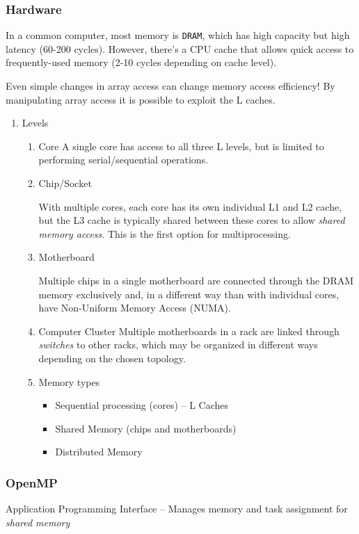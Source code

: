 \documentclass[11pt]{article}
\begin{document}
\subsubsection{Hardware}
\label{sec-1-1-2}
In a common computer, most memory is \texttt{DRAM}, which has high capacity but high latency (60-200 cycles). However, there's a CPU cache that allows quick access to frequently-used memory (2-10 cycles depending on cache level).

Even simple changes in array access can change memory access efficiency! By manipulating array access it is possible to exploit the L caches.
\begin{enumerate}
\item Levels
\label{sec-1-1-2-1}
\begin{enumerate}
\item Core
\label{sec-1-1-2-1-1}
A single core has access to all three L levels, but is limited to performing serial/sequential operations.
\item Chip/Socket
\label{sec-1-1-2-1-2}

With multiple cores, each core has its own individual L1 and L2 cache, but the L3 cache is typically shared between these cores to allow \emph{shared memory access}. This is the first option for multiprocessing.

\item Motherboard
\label{sec-1-1-2-1-3}

Multiple chips in a single motherboard are connected through the DRAM memory exclusively and, in a different way than with individual cores, have Non-Uniform Memory Access (NUMA).

\item Computer Cluster
\label{sec-1-1-2-1-4}
Multiple motherboards in a rack are linked through \emph{switches} to other racks, which may be organized in different ways depending on the chosen topology.

\item Memory types
\label{sec-1-1-2-1-5}
\begin{itemize}
\item Sequential processing (cores) -- L Caches
\item Shared Memory (chips and motherboards)
\item Distributed Memory
\end{itemize}
\end{enumerate}
\end{enumerate}
\subsubsection{OpenMP}
\label{sec-1-1-3}
Application Programming Interface -- Manages memory and task assignment for \emph{shared memory}
\end{document}
